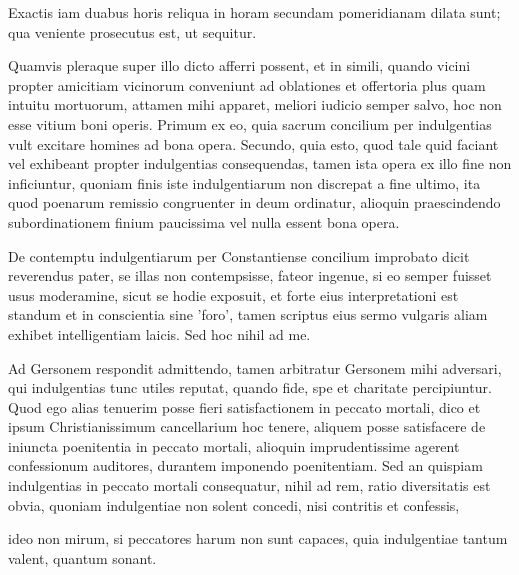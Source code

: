 Exactis iam duabus horis reliqua in horam secundam pomeridianam dilata sunt; qua veniente prosecutus est, ut sequitur.

Quamvis pleraque super illo dicto afferri possent, et in simili, quando vicini propter amicitiam vicinorum conveniunt ad oblationes et offertoria plus quam intuitu mortuorum, attamen mihi apparet, meliori iudicio semper salvo, hoc non esse vitium boni operis. Primum ex eo, quia sacrum concilium per indulgentias vult excitare homines ad bona opera. Secundo, quia esto, quod tale quid faciant vel exhibeant propter indulgentias consequendas, tamen ista opera ex illo fine non inficiuntur, quoniam finis iste indulgentiarum non discrepat a fine ultimo, ita quod poenarum remissio congruenter in deum ordinatur, alioquin praescindendo subordinationem finium paucissima vel nulla essent bona opera.

De contemptu indulgentiarum per Constantiense concilium improbato dicit reverendus pater, se illas non contempsisse, fateor ingenue, si eo semper fuisset usus moderamine, sicut se hodie exposuit, et forte eius interpretationi est standum et in conscientia sine 'foro', tamen scriptus eius sermo vulgaris aliam exhibet intelligentiam laicis. Sed hoc nihil ad me.

Ad Gersonem respondit admittendo, tamen arbitratur Gersonem mihi adversari, qui indulgentias tunc utiles reputat, quando fide, spe et charitate percipiuntur. Quod ego alias tenuerim posse fieri satisfactionem in peccato mortali, dico et ipsum Christianissimum cancellarium hoc tenere, aliquem posse satisfacere de iniuncta poenitentia in peccato mortali, alioquin imprudentissime agerent confessionum auditores, durantem imponendo poenitentiam. Sed an quispiam indulgentias in peccato mortali consequatur, nihil ad rem, ratio diversitatis est obvia, quoniam indulgentiae non solent concedi, nisi contritis et confessis,

ideo non mirum, si peccatores harum non sunt capaces, quia indulgentiae tantum valent, quantum sonant.

